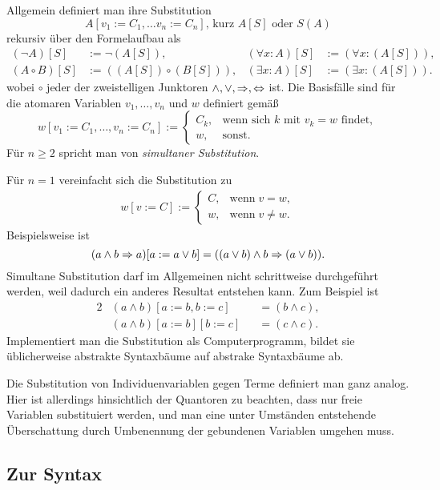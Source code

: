 Allgemein definiert man ihre Substitution
\[A[v_1:=C_1,\ldots v_n:=C_n],\,\text{kurz $A[S]$ oder $S(A)$}\]
rekursiv über den Formelaufbau als
\begin{align*}
(\lnot A)[S] &:= \lnot (A[S]), & (\forall x\colon A)[S] &:= (\forall x\colon (A[S])),\\
(A\circ B)[S] &:= ((A[S])\circ (B[S])), & (\exists x\colon A)[S] &:= (\exists x\colon (A[S])).
\end{align*}
wobei $\circ$ jeder der zweistelligen Junktoren
$\land,\lor,\Rightarrow,\Leftrightarrow$ ist. Die Basisfälle sind für die atomaren
Variablen $v_1,\ldots, v_n$ und $w$ definiert gemäß
\[w[v_1:=C_1, \ldots, v_n:=C_n] := \begin{cases}
C_k, & \text{wenn sich $k$ mit $v_k=w$ findet},\\
w, & \text{sonst}.
\end{cases}\]
Für $n\ge 2$ spricht man von \emph{simultaner Substitution}.

Für $n=1$ vereinfacht sich die Substitution zu
\begin{align*}
w[v:=C] := \begin{cases}
C, & \text{wenn}\;v=w,\\
w, & \text{wenn}\;v\ne w.
\end{cases}
\end{align*}
Beispielsweise ist
\[(a\land b\Rightarrow a)[a:=a\lor b] = ((a\lor b)\land b\Rightarrow (a\lor b)).\]
Simultane Substitution darf im Allgemeinen nicht schrittweise
durchgeführt werden, weil dadurch ein anderes Resultat entstehen kann.
Zum Beispiel ist
\begin{alignat*}{2}
& (a\land b)[a:=b,b:=c] &&= (b\land c),\\
& (a\land b)[a:=b][b:=c] &&= (c\land c).
\end{alignat*}
Implementiert man die Substitution als Computerprogramm, bildet sie
üblicherweise abstrakte Syntaxbäume auf abstrake Syntaxbäume ab.

Die Substitution von Individuenvariablen gegen Terme definiert man
ganz analog. Hier ist allerdings hinsichtlich der Quantoren zu beachten,
dass nur freie Variablen substituiert werden, und man eine unter
Umständen entstehende Überschattung durch Umbenennung der gebundenen
Variablen umgehen muss.

\subsection{Zur Syntax}

